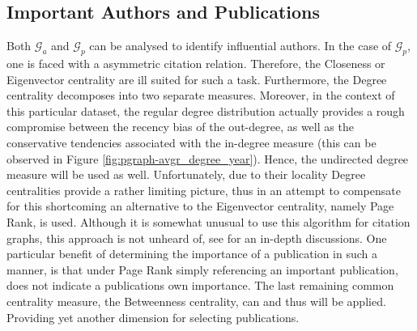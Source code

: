 \documentclass[11pt,a4paper]{book}
\theoremstyle{definition}
\theoremstyle{definition}
\theoremstyle{definition}
\theoremstyle{remark}
\newcommand{\pgraph}{\mathcal{G}_{p}}
\newcommand{\agraph}{\mathcal{G}_{a}}
\begin{document}
%


\subsection{Important Authors and Publications}
Both $\agraph$ and $\pgraph$ can be analysed to identify influential authors.
In the case of $\pgraph$, one is faced with a asymmetric citation relation. Therefore, the Closeness or Eigenvector centrality are ill suited for such a task.
Furthermore, the Degree centrality decomposes into two separate  measures. Moreover, in the context of this particular dataset, the regular degree distribution actually provides a rough compromise between the recency bias of the out-degree, as well as the conservative tendencies associated with the in-degree measure (this can be observed in Figure \ref{fig:pgraph-avgr_degree_year}). Hence, the undirected degree measure will be used as well. Unfortunately, due to their locality Degree centralities provide a rather limiting picture, thus in an attempt to compensate for this shortcoming an alternative to the Eigenvector centrality, namely Page Rank, is used. Although it is somewhat unusual to use this algorithm for citation graphs, this approach is not unheard of, see \parencite{ding2009pagerank,ma2008bringing,chen2007finding,maslov2008promise,nykl2014pagerank} for an in-depth discussions. One particular benefit of determining the importance of a publication in such a manner, is that under Page Rank simply referencing an important publication, does not indicate a publications own importance. The last remaining common centrality measure, the Betweenness centrality, can and thus will be applied. Providing yet another dimension for selecting publications. 
\end{document}
